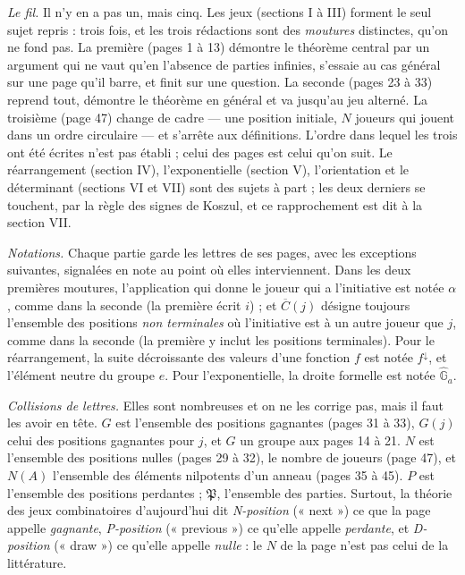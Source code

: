 \documentclass[11pt,a4paper]{article}
\begin{document}
\emph{Le fil.} Il n'y en a pas un, mais cinq. Les jeux (sections I à III)
forment le seul sujet repris : trois fois, et les trois rédactions sont des
\emph{moutures} distinctes, qu'on ne fond pas. La première (pages 1 à 13)
démontre le théorème central par un argument qui ne vaut qu'en l'absence de
parties infinies, s'essaie au cas général sur une page qu'il barre, et finit
sur une question. La seconde (pages 23 à 33) reprend tout, démontre le
théorème en général et va jusqu'au jeu alterné. La troisième (page 47) change
de cadre --- une position initiale, $N$ joueurs qui jouent dans un ordre
circulaire --- et s'arrête aux définitions. L'ordre dans lequel les trois ont
été écrites n'est pas établi ; celui des pages est celui qu'on suit. Le
réarrangement (section IV), l'exponentielle (section V), l'orientation et le
déterminant (sections VI et VII) sont des sujets à part ; les deux derniers se
touchent, par la règle des signes de Koszul, et ce rapprochement est dit à
la section VII.

\emph{Notations.} Chaque partie garde les lettres de ses pages, avec les
exceptions suivantes, signalées en note au point où elles interviennent. Dans
les deux premières moutures, l'application qui donne le joueur qui a
l'initiative est notée $\alpha$, comme dans la seconde (la première écrit
$i$) ; et $\overline{C}(j)$ désigne toujours l'ensemble des positions
\emph{non terminales} où l'initiative est à un autre joueur que $j$, comme
dans la seconde (la première y inclut les positions terminales). Pour le
réarrangement, la suite décroissante des valeurs d'une fonction $f$ est notée
$f^{\downarrow}$, et l'élément neutre du groupe $e$. Pour l'exponentielle, la
droite formelle est notée $\widehat{\mathbb{G}}_a$.

\emph{Collisions de lettres.} Elles sont nombreuses et on ne les corrige pas,
mais il faut les avoir en tête. $G$ est l'ensemble des positions gagnantes
(pages 31 à 33), $G(j)$ celui des positions gagnantes pour $j$, et $G$ un
groupe aux pages 14 à 21. $N$ est l'ensemble des positions nulles (pages 29
à 32), le nombre de joueurs (page 47), et $N(A)$ l'ensemble des éléments
nilpotents d'un anneau (pages 35 à 45). $P$ est l'ensemble des positions
perdantes ; $\mathfrak{P}$, l'ensemble des parties. Surtout, la théorie des
jeux combinatoires d'aujourd'hui dit \emph{N-position} (« next ») ce que la
page appelle \emph{gagnante}, \emph{P-position} (« previous ») ce qu'elle
appelle \emph{perdante}, et \emph{D-position} (« draw ») ce qu'elle appelle
\emph{nulle} : le $N$ de la page n'est pas celui de la littérature.
\end{document}
